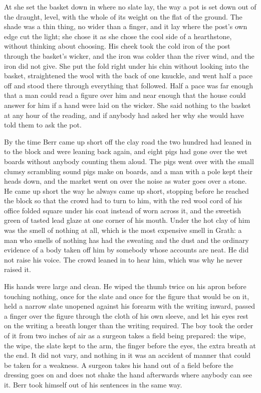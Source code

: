 At  she set the basket down in  where no slate lay, the way a pot is set down out of the draught, level, with the whole of its weight on the flat of the ground. The shade was a thin thing, no wider than a finger, and it lay where the post's own edge cut the light; she chose it as she chose the cool side of a hearthstone, without thinking about choosing. His cheek took the cold iron of the post through the basket's wicker, and the iron was colder than the river wind, and the iron did not give. She put the fold right under his chin without looking into the basket, straightened the wool with the back of one knuckle, and went half a pace off and stood there through everything that followed. Half a pace was far enough that a man could read a figure over him and near enough that the house could answer for him if a hand were laid on the wicker. She said nothing to the basket at any hour of the reading, and if anybody had asked her why she would have told them to ask the pot.

\scenebreak

By the time Berr came up short off the clay road the two hundred had leaned in to the block and were leaning back again, and eight pigs had gone over the wet boards without anybody counting them aloud. The pigs went over with the small clumsy scrambling sound pigs make on boards, and a man with a pole kept their heads down, and the market went on over the noise as water goes over a stone. He came up short the way he always came up short, stopping before he reached the block so that the crowd had to turn to him, with the red wool cord of his office folded square under his coat instead of worn across it, and the sweetish green of tasted lead glaze at one corner of his mouth. Under the hot clay of him was the smell of nothing at all, which is the most expensive smell in Grath: a man who smells of nothing has had the sweating and the dust and the ordinary evidence of a body taken off him by somebody whose accounts are neat. He did not raise his voice. The crowd leaned in to hear him, which was why he never raised it.

His hands were large and clean. He wiped the thumb twice on his apron before touching nothing, once for the slate and once for the figure that would be on it, held a narrow slate unopened against his forearm with the writing inward, passed a finger over the figure through the cloth of his own sleeve, and let his eyes rest on the writing a breath longer than the writing required. The boy took the order of it from two inches of air as a surgeon takes a field being prepared: the wipe, the wipe, the slate kept to the arm, the finger before the eyes, the extra breath at the end. It did not vary, and nothing in it was an accident of manner that could be taken for a weakness. A surgeon takes his hand out of a field before the dressing goes on and does not shake the hand afterwards where anybody can see it. Berr took himself out of his sentences in the same way.

